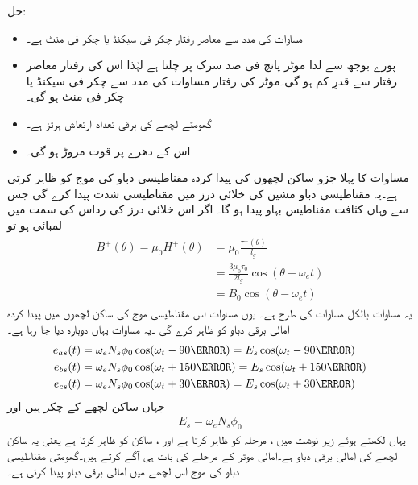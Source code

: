 حل:
\begin{itemize}
\item
مساوات   کی مدد سے معاصر رفتار  چکر فی سیکنڈ یا  چکر فی منٹ ہے۔
\item
پورے بوجھ سے لدا موٹر پانچ فی صد سرک پر چلتا ہے لہٰذا اس کی رفتار معاصر رفتار سے قدرِ کم ہو گی۔موٹر کی رفتار مساوات    کی مدد سے  چکر فی سیکنڈ یا  چکر فی منٹ ہو گی۔
\item
گھومتے لچھے کی برقی تعداد ارتعاش  ہرٹز ہے۔
\item
اس کے دھرے پر قوت مروڑ  ہو گی۔
\end{itemize}
%
مساوات   کا پہلا جزو ساکن لچھوں کی پیدا کردہ مقناطیسی دباو کی موج  کو ظاہر کرتی ہے۔یہ مقناطیسی دباو مشین کی خلائی درز میں مقناطیسی شدت  پیدا کرے گی جس سے وہاں کثافت مقناطیس بہاو  پیدا ہو گا۔ اگر اس خلائی درز کی رداس کی سمت میں لمبائی  ہو تو
\begin{gather}
\begin{aligned}
B^+(\theta)=\mu_0 H^+(\theta)&=\mu_0 \frac{\tau^+(\theta)}{l_g}\\
&=\frac{3 \mu_0 \tau_0}{2 l_g} \cos (\theta-\omega_e t)\\
&=B_0 \cos (\theta-\omega_e t)
\end{aligned}
\end{gather}
یہ مساوات بالکل مساوات   کی طرح ہے۔ یوں مساوات    اس مقناطیسی موج  کی ساکن لچھوں میں پیدا کردہ امالی برقی دباو کو ظاہر کرے گی ۔یہ مساوات یہاں دوبارہ دیا جا رہا ہے۔
\begin{gather}
\begin{aligned}\label{مساوات_امالی_تین_دور_سائن_نما_برقی_دباو}
e_{as}(t)&=\omega_e N_s \phi_0 \cos (\omega_t -90\degree)=E_s \cos (\omega_t -90\degree)\\
e_{bs}(t)&=\omega_e N_s \phi_0 \cos (\omega_t +150\degree)=E_s \cos (\omega_t +150\degree)\\
e_{cs}(t)&=\omega_e N_s \phi_0 \cos (\omega_t +30\degree)=E_s \cos (\omega_t +30\degree)
\end{aligned}
\end{gather}
جہاں  ساکن لچھے کے چکر ہیں اور
\begin{align}
E_s=\omega_e N_s \phi_0
\end{align}
یہاں   لکھتے ہوئے  زیر نوشت  میں  ، مرحلہ  کو ظاہر کرتا ہے اور ، ساکن کو ظاہر کرتا ہے یعنی یہ ساکن   لچھے کی امالی برقی دباو ہے۔امالی موٹر کے   مرحلے  کی بات ہی آگے کرتے ہیں۔گھومتی مقناطیسی دباو کی موج اس  لچھے میں امالی برقی دباو  پیدا کرتی ہے۔

